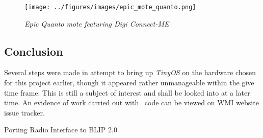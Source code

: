 \begin{figure}
\texttt{[image: ../figures/images/epic\_mote\_quanto.png]}
\caption{\emph{Epic Quanto mote featuring Digi Connect-ME}}
\end{figure}


\subsection{Conclusion}

  Several steps were made in attempt to bring up \emph{TinyOS} on the
 hardware chosen for this project earlier, though it appeared rather
 unmanageable within the give time frame. This is still a subject of
 interest and shall be looked into at a later time. An evidence of
 work carried out with \TinyOS\ code can be viewed on WMI website
 issue tracker.

\TrackerList
  Porting Radio Interface to BLIP 2.0
\TrackerEnd

